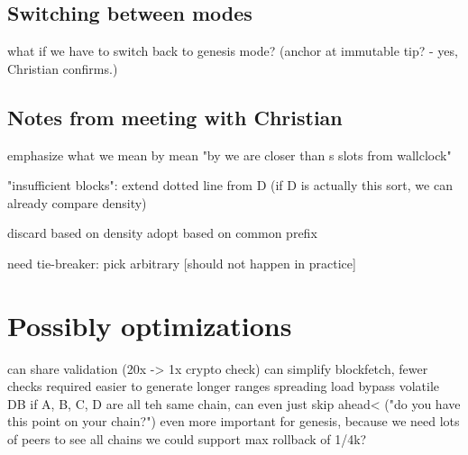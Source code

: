 \subsection{Switching between modes}
\label{genesis:switching-between-modes}

what if we have to switch back to genesis mode?
(anchor at immutable tip? - yes, Christian confirms.)

\subsection{Notes from meeting with Christian}

emphasize what we mean by mean "by we are closer than s slots from wallclock"

"insufficient blocks": extend dotted line from D
(if D is actually this sort, we can already compare density)

discard based on density
adopt based on common prefix

need tie-breaker: pick arbitrary [should not happen in practice]





\section{Possibly optimizations}

can share validation (20x -> 1x crypto check)
can simplify blockfetch, fewer checks required
  easier to generate longer ranges
  spreading load
bypass volatile DB
if A, B, C, D are all teh same chain, can even just skip ahead<
  ("do you have this point on your chain?")
even more important for genesis, because we need lots of peers
to see all chains
we could support max rollback of 1/4k?
